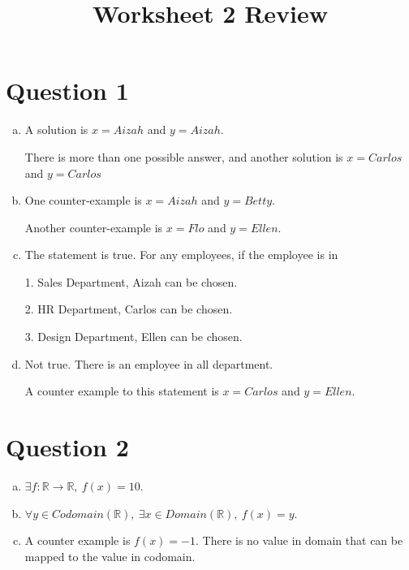 \documentclass[12pt]{article}
\begin{document}
\title{Worksheet 2 Review}
\maketitle

\section*{Question 1}
\begin{enumerate}[a.]
    \item

    A solution is $x = Aizah$ and $y = Aizah$.

    \bigskip

    There is more than one possible answer, and another solution is $x = Carlos$
    and $y = Carlos$

    \item

    One counter-example is $x = Aizah$ and $y = Betty$.

    \bigskip

    Another counter-example is $x = Flo$ and $y = Ellen$.

    \item

    The statement is true. For any employees, if the employee is in

    \bigskip

    1. Sales Department, Aizah can be chosen.

    2. HR Department, Carlos can be chosen.

    3. Design Department, Ellen can be chosen.

    \item

    Not true. There is an employee in all department.

    \bigskip

    A counter example to this statement is $x = Carlos$ and $y = Ellen$.

\end{enumerate}

\section*{Question 2}
\begin{enumerate}[a.]
    \item

    $\exists f: \mathbb{R} \to \mathbb{R},\: f(x) = 10$.

    \item

    $\forall y \in Codomain(\mathbb{R}),\:\exists x \in Domain(\mathbb{R}),\:
    f(x) = y$.

    \item

    A counter example is $f(x) = -1$. There is no value in domain that can be
    mapped to the value in codomain.

\end{enumerate}
\end{document}
